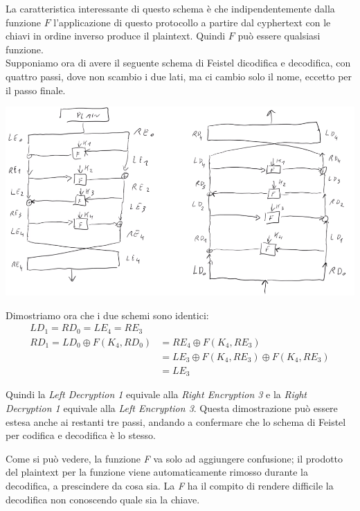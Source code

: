 \noindent La caratteristica interessante di questo schema è che indipendentemente dalla funzione $F$ l'applicazione di questo protocollo a partire dal cyphertext con le chiavi in ordine inverso produce il plaintext. Quindi $F$ può essere qualsiasi funzione. 
\\

\noindent Supponiamo ora di avere il seguente schema di Feistel dicodifica e decodifica, con quattro passi, dove non scambio i due lati, ma ci cambio solo il nome, eccetto per il passo finale.\\

\begin{center}
    \includegraphics[width=1\textwidth]{images/4.png}
\end{center}

\noindent Dimostriamo ora che i due schemi sono identici:
\begin{align*}
    LD_1 = RD_0 = LE_4 = RE_3\\
    RD_1 = LD_0 \oplus F(K_4, RD_0) &= RE_4 \oplus F(K_4, RE_3)\\
                                    &= LE_3 \oplus F(K_4, RE_3) \oplus F(K_4, RE_3)\\
                                    &= LE_3
\end{align*}      

\noindent Quindi la \textit{Left Decryption 1} equivale alla \textit{Right Encryption 3} e la \textit{Right Decryption 1} equivale alla \textit{Left Encryption 3}. Questa dimostrazione può essere estesa anche ai restanti tre passi, andando a confermare che lo schema di Feistel per codifica e decodifica è lo stesso. 

Come si può vedere, la funzione \textit{F} va solo ad aggiungere confusione; il prodotto del plaintext per la funzione viene automaticamente rimosso durante la decodifica, a prescindere da cosa sia. La \textit{F} ha il compito di rendere difficile la decodifica non conoscendo quale sia la chiave. 

